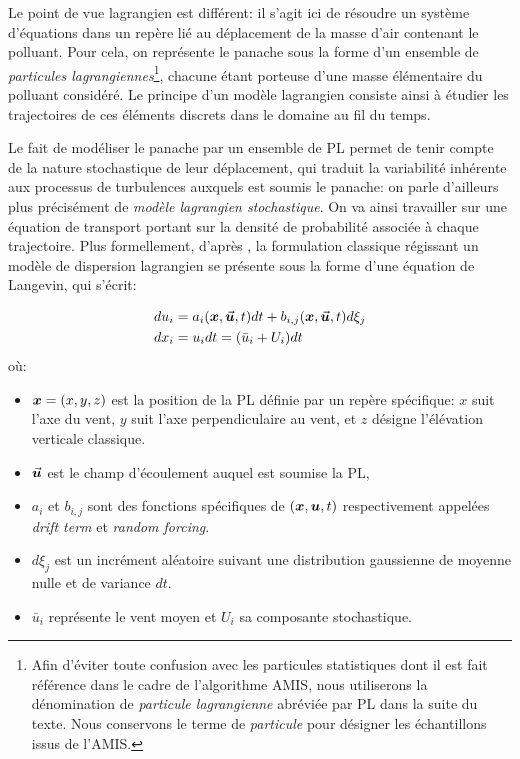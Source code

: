 Le point de vue lagrangien est différent: il s'agit ici de résoudre un système d'équations dans un repère lié au déplacement de la masse d'air contenant le polluant. Pour cela, on représente le panache sous la forme d'un ensemble de \textit{particules lagrangiennes}\footnote{Afin d'éviter toute confusion avec les particules statistiques dont il est fait référence dans le cadre de l'algorithme AMIS, nous utiliserons la dénomination  de \textit{particule lagrangienne} abréviée par PL dans la suite du texte. Nous conservons le terme de \textit{particule} pour désigner les échantillons issus de l'AMIS.}, chacune étant porteuse d'une masse élémentaire du polluant considéré. Le principe d'un modèle lagrangien consiste ainsi à étudier les trajectoires de ces éléments discrets dans le domaine au fil du temps.

Le fait de modéliser le panache par un ensemble de PL permet de tenir compte de la nature stochastique de leur déplacement, qui traduit la variabilité inhérente aux processus de turbulences auxquels est soumis le panache: on parle d'ailleurs plus précisément de \textit{modèle lagrangien stochastique}. On va ainsi travailler sur une équation de transport portant sur la densité de probabilité associée à chaque trajectoire. Plus formellement, d'après \cite{Flesch1995}, la formulation classique régissant un modèle de dispersion lagrangien se présente sous la forme d'une équation de Langevin, qui s'écrit: 

\begin{equation}
	\begin{split}
		du_i &= a_i({\bm{x}}, \vec{{\bm{u}}}, t)dt + b_{i,j}({\bm{x}}, \vec{{\bm{u}}}, t)d\xi_j  \\
		dx_i &= u_i dt = (\bar{u}_i + U_i)dt
	\end{split}
	\label{eq_langevin}
\end{equation}
où:
 \begin{itemize}
	\item ${\bm{x}} = (x, y, z)$ est la position de la PL  définie par un repère spécifique: $x$ suit l'axe du vent, $y$ suit l'axe perpendiculaire au vent, et $z$ désigne l'élévation verticale classique. 
	\item $\vec{{\bm{u}}}$ est le champ d'écoulement auquel est soumise la PL,
	\item $a_i$ et $b_{i,j}$ sont des fonctions spécifiques de $({\bm{x}}, {\bm{u}}, t)$ respectivement appelées \textit{drift term} et \textit{random forcing}.
	\item $d\xi_j$ est un incrément aléatoire suivant une distribution gaussienne de moyenne nulle et de variance $dt$.
	\item $\bar{u}_i$ représente le vent moyen et $U_i$ sa composante stochastique.
	
\end{itemize}

